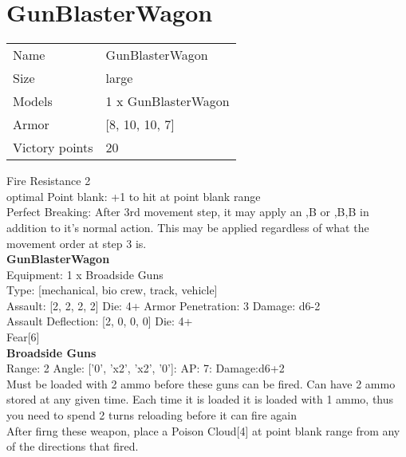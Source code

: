 \pagebreak

\section{ GunBlasterWagon }

\begin{tabular}{ll}
  Name & GunBlasterWagon \\
  Size & large\\
  Models & 1 x GunBlasterWagon\\
  Armor & [8, 10, 10, 7]\\
  Victory points & 20\\
\end{tabular}

Fire Resistance 2\\ 
optimal Point blank: +1 to hit at point blank range\\ 
Perfect Breaking: After 3rd movement step, it may apply an ,B or ,B,B in addition to it's normal action. This may be applied regardless of what the movement order at step 3 is.\\ 


{\bf GunBlasterWagon } \\
Equipment: 1 x Broadside Guns \\
Type: [mechanical, bio crew, track, vehicle] \\

Assault: [2, 2, 2, 2] Die: 4+ Armor Penetration: 3 Damage: d6-2 \\
Assault Deflection: [2, 0, 0, 0] Die: 4+\\
\indent Fear[6]\\ 
 



{\bf Broadside Guns } \\



Range: 2  Angle: ['0', 'x2', 'x2', '0']: AP: 7: Damage:d6+2 \\
Must be loaded with 2 ammo before these guns can be fired. Can have 2 ammo stored at any given time. Each time it is loaded it is loaded with 1 ammo, thus you need to spend 2 turns reloading before it can fire again\\ 
After firng these weapon, place a Poison Cloud[4] at point blank range from any of the directions that fired.\\ 




 





